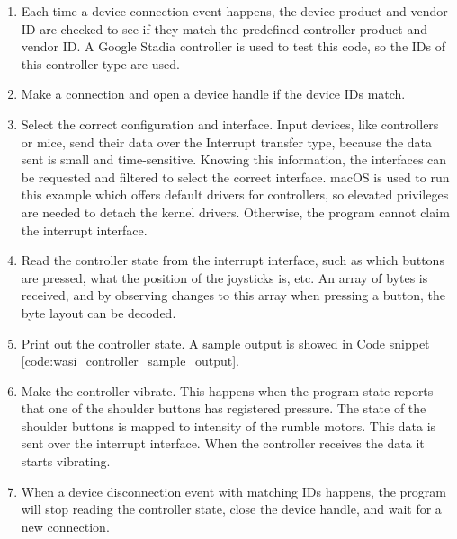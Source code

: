 \begin{enumerate}
\item Each time a device connection event happens, the device product and vendor ID are checked to see if they match the predefined controller product and vendor ID. A Google Stadia controller is used to test this code, so the IDs of this controller type are used.

\item Make a connection and open a device handle if the device IDs match.

\item Select the correct configuration and interface. Input devices, like controllers or mice, send their data over the Interrupt transfer type, because the data sent is small and time-sensitive. Knowing this information, the interfaces can be requested and filtered to select the correct interface. macOS is used to run this example which offers default drivers for controllers, so elevated privileges are needed to detach the kernel drivers. Otherwise, the program cannot claim the interrupt interface.

\item Read the controller state from the interrupt interface, such as which buttons are pressed, what the position of the joysticks is, etc. An array of bytes is received, and by observing changes to this array when pressing a button, the byte layout can be decoded.

\item Print out the controller state. A sample output is showed in Code snippet \ref{code:wasi_controller_sample_output}.

\item Make the controller vibrate. This happens when the program state reports that one of the shoulder buttons has registered pressure. The state of the shoulder buttons is mapped to intensity of the rumble motors. This data is sent over the interrupt interface. When the controller receives the data it starts vibrating.

\item When a device disconnection event with matching IDs happens, the program will stop reading the controller state, close the device handle, and wait for a new connection.


\end{enumerate}

